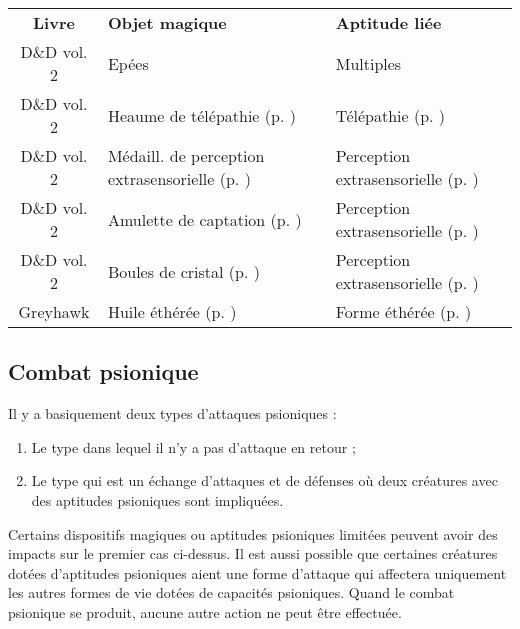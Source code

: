 \bigskip
\begin{tabular}{cll}
\textbf{Livre}  & \textbf{Objet magique}    & \textbf{Aptitude liée} \\
D\&D vol. 2     & Epées                     & Multiples \\
D\&D vol. 2     & Heaume de télépathie (p. \pageref{objet-heaume-telepathie})   & Télépathie (p. \pageref{objet-heaume-telepathie})  \\
D\&D vol. 2     & Médaill. de perception extrasensorielle (p. \pageref{objet-medaillon-esp}) & Perception extrasensorielle (p. \pageref{magicien-ESP}) \\
D\&D vol. 2     & Amulette de captation (p. \pageref{objet-amulette-captation}) & Perception extrasensorielle (p. \pageref{magicien-ESP}) \\
D\&D vol. 2     & Boules de cristal (p. \pageref{objet-boule-cristal}) & Perception extrasensorielle (p. \pageref{magicien-ESP}) \\
Greyhawk        & Huile éthérée (p. \pageref{objet-huile-etheree}) & Forme éthérée (p. \pageref{magicien-forme-etheree}) \\
\end{tabular}


\subsection*{Combat psionique}

Il y a basiquement deux types d'attaques psioniques :

\bigskip

\begin{enumerate}
\item Le type dans lequel il n'y a pas d'attaque en retour ;
\item Le type qui est un échange d'attaques et de défenses où deux créatures avec des aptitudes psioniques sont impliquées.
\end{enumerate}

\bigskip

Certains dispositifs magiques ou aptitudes psioniques limitées peuvent avoir des impacts sur le premier cas ci-dessus. Il est aussi possible que certaines créatures dotées d'aptitudes psioniques aient une forme d'attaque qui affectera uniquement les autres formes de vie dotées de capacités psioniques. Quand le combat psionique se produit, aucune autre action ne peut être effectuée.

